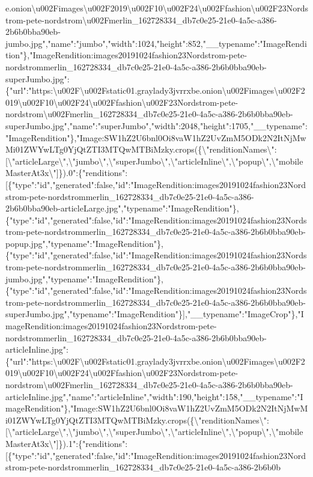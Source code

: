 e.onion\textbackslash{}u002Fimages\textbackslash{}u002F2019\textbackslash{}u002F10\textbackslash{}u002F24\textbackslash{}u002Ffashion\textbackslash{}u002F23Nordstrom-pete-nordstrom\textbackslash{}u002Fmerlin\_162728334\_db7c0e25-21e0-4a5c-a386-2b6b0bba90eb-jumbo.jpg","name":"jumbo","width":1024,"height":852,"\_\_typename":"ImageRendition"\},"ImageRendition:images20191024fashion23Nordstrom-pete-nordstrommerlin\_162728334\_db7c0e25-21e0-4a5c-a386-2b6b0bba90eb-superJumbo.jpg":\{"url":"https:\textbackslash{}u002F\textbackslash{}u002Fstatic01.graylady3jvrrxbe.onion\textbackslash{}u002Fimages\textbackslash{}u002F2019\textbackslash{}u002F10\textbackslash{}u002F24\textbackslash{}u002Ffashion\textbackslash{}u002F23Nordstrom-pete-nordstrom\textbackslash{}u002Fmerlin\_162728334\_db7c0e25-21e0-4a5c-a386-2b6b0bba90eb-superJumbo.jpg","name":"superJumbo","width":2048,"height":1705,"\_\_typename":"ImageRendition"\},"Image:SW1hZ2U6bnl0Oi8vaW1hZ2UvZmM5ODk2N2ItNjMwMi01ZWYwLTg0YjQtZTI3MTQwMTBiMzky.crops(\{\textbackslash{}"renditionNames\textbackslash{}":{[}\textbackslash{}"articleLarge\textbackslash{}",\textbackslash{}"jumbo\textbackslash{}",\textbackslash{}"superJumbo\textbackslash{}",\textbackslash{}"articleInline\textbackslash{}",\textbackslash{}"popup\textbackslash{}",\textbackslash{}"mobileMasterAt3x\textbackslash{}"{]}\}).0":\{"renditions":{[}\{"type":"id","generated":false,"id":"ImageRendition:images20191024fashion23Nordstrom-pete-nordstrommerlin\_162728334\_db7c0e25-21e0-4a5c-a386-2b6b0bba90eb-articleLarge.jpg","typename":"ImageRendition"\},\{"type":"id","generated":false,"id":"ImageRendition:images20191024fashion23Nordstrom-pete-nordstrommerlin\_162728334\_db7c0e25-21e0-4a5c-a386-2b6b0bba90eb-popup.jpg","typename":"ImageRendition"\},\{"type":"id","generated":false,"id":"ImageRendition:images20191024fashion23Nordstrom-pete-nordstrommerlin\_162728334\_db7c0e25-21e0-4a5c-a386-2b6b0bba90eb-jumbo.jpg","typename":"ImageRendition"\},\{"type":"id","generated":false,"id":"ImageRendition:images20191024fashion23Nordstrom-pete-nordstrommerlin\_162728334\_db7c0e25-21e0-4a5c-a386-2b6b0bba90eb-superJumbo.jpg","typename":"ImageRendition"\}{]},"\_\_typename":"ImageCrop"\},"ImageRendition:images20191024fashion23Nordstrom-pete-nordstrommerlin\_162728334\_db7c0e25-21e0-4a5c-a386-2b6b0bba90eb-articleInline.jpg":\{"url":"https:\textbackslash{}u002F\textbackslash{}u002Fstatic01.graylady3jvrrxbe.onion\textbackslash{}u002Fimages\textbackslash{}u002F2019\textbackslash{}u002F10\textbackslash{}u002F24\textbackslash{}u002Ffashion\textbackslash{}u002F23Nordstrom-pete-nordstrom\textbackslash{}u002Fmerlin\_162728334\_db7c0e25-21e0-4a5c-a386-2b6b0bba90eb-articleInline.jpg","name":"articleInline","width":190,"height":158,"\_\_typename":"ImageRendition"\},"Image:SW1hZ2U6bnl0Oi8vaW1hZ2UvZmM5ODk2N2ItNjMwMi01ZWYwLTg0YjQtZTI3MTQwMTBiMzky.crops(\{\textbackslash{}"renditionNames\textbackslash{}":{[}\textbackslash{}"articleLarge\textbackslash{}",\textbackslash{}"jumbo\textbackslash{}",\textbackslash{}"superJumbo\textbackslash{}",\textbackslash{}"articleInline\textbackslash{}",\textbackslash{}"popup\textbackslash{}",\textbackslash{}"mobileMasterAt3x\textbackslash{}"{]}\}).1":\{"renditions":{[}\{"type":"id","generated":false,"id":"ImageRendition:images20191024fashion23Nordstrom-pete-nordstrommerlin\_162728334\_db7c0e25-21e0-4a5c-a386-2b6b0b
